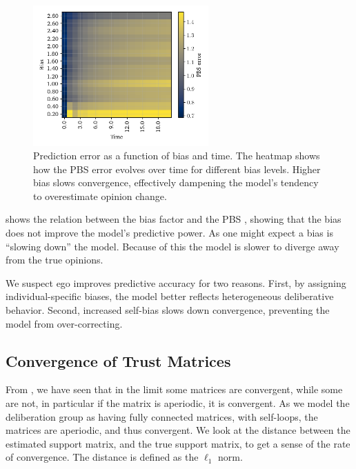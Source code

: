 \documentclass[11pt, oneside, dvipsnames]{Thesis} %
\begin{document}
\begin{figure}[ht]
	\centering

	\includegraphics[width=0.6\textwidth]{Figures/bias_time_imshow.png}
	\hspace{1em}
	\caption{Prediction error as a function of bias and time. The heatmap shows how the PBS error evolves over time for different bias levels. Higher bias slows convergence, effectively dampening the model’s tendency to overestimate opinion change.}
	\label{fig:bias_slowdown}
\end{figure}

 shows the relation between the bias factor and the PBS
, showing that the bias does not improve the model's predictive power. As
one might expect a bias is ``slowing down'' the model. Because of this the
model is slower to diverge away from the true opinions.


We suspect ego improves predictive accuracy for two reasons. First, by
assigning individual-specific biases, the model better reflects heterogeneous
deliberative behavior. Second, increased self-bias slows down convergence,
preventing the model from over-correcting.

\subsection{Convergence of Trust Matrices}

From , we have seen that in the limit some matrices are
convergent, while some are not, in particular if the matrix is aperiodic, it
is convergent. As we model the deliberation group as having fully connected
matrices, with self-loops, the matrices are aperiodic, and thus convergent. We look at the
distance between the estimated support matrix, and the true support matrix, to
get a sense of the rate of convergence. The distance is defined as the
$\ell_1$ norm.
\end{document}
